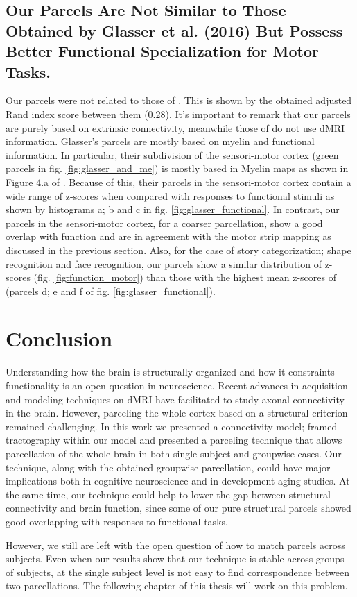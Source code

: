 \subsection{Our Parcels Are Not Similar to Those Obtained by Glasser et al. (2016) But 
			Possess Better Functional Specialization for Motor Tasks.}
Our parcels were not related to those of \citet{Glasser2016}. This is shown by the
obtained adjusted Rand index score between them (0.28). It's important to remark that
our parcels are purely based on extrinsic connectivity, meanwhile those of \citet{Glasser2016}
do not use dMRI information. Glasser's parcels are mostly based on myelin and functional information.
In particular, their subdivision of the sensori-motor cortex (green parcels in fig.
\ref{fig:glasser_and_me}) is mostly based in Myelin maps as shown in Figure 4.a of 
\citet{Glasser2016}. Because of this, their parcels in the sensori-motor cortex contain 
a wide range of z-scores when compared with responses to functional stimuli as shown by
histograms a; b and c in fig.
\ref{fig:glasser_functional}. In contrast, our parcels in the sensori-motor cortex,
for a coarser parcellation, show a good overlap with function and are in agreement with
the motor strip mapping as discussed in the previous section. Also, for the case of story
categorization; shape recognition and face recognition, our parcels show a similar
distribution of z-scores (fig. \ref{fig:function_motor}) than those with the highest 
mean z-scores of \citet{Glasser2016} (parcels d; e and f of  fig. \ref{fig:glasser_functional}).
%
\section{Conclusion}
%
Understanding how the brain is structurally organized and how it constraints
functionality is an open question in neuroscience. Recent advances in
acquisition and modeling techniques on dMRI have facilitated to study 
axonal connectivity in the brain. However, parceling the whole cortex based
on a structural criterion remained challenging. In this work we presented a 
connectivity model; framed tractography within our model and 
presented a parceling technique that allows parcellation
of the whole brain in both single subject and groupwise cases. Our
technique, along with the obtained groupwise parcellation, could have major
implications both in cognitive neuroscience and in development-aging studies.
At the same time, our technique could help to lower the gap between structural
connectivity and brain function, since some of our pure structural parcels showed
good overlapping with responses to functional tasks.

However, we still are left with the open question of how to match parcels
across subjects. Even when our results show that our technique is stable
across groups of subjects, at the single subject level is not easy to find
correspondence between two parcellations. The following chapter of this thesis
will work on this problem.

%
\chapterbib
